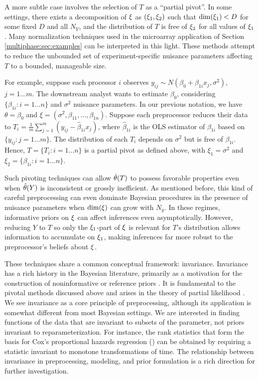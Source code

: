 A more subtle case involves the selection of $T$ as a ``partial pivot''.
In some settings, there exists a decomposition of $\xi$ as $(\xi_1, \xi_2)$ such that $\dim(\xi_1) < D$ for some fixed $D$ and all $N_Y$, and the distribution of $T$ is free of  $\xi_2$ for all values of $\xi_1$.
Many normalization techniques used in the microarray application of Section \ref{multiphase:sec:examples} can be interpreted in this light.
These methods attempt to reduce the unbounded set of experiment-specific nuisance parameters affecting $T$ to a bounded, manageable size.

For example, suppose each processor $i$ observes $y_{ij} \sim N(\beta_0 + \beta_{1i} x_j, \sigma^2)$, $j=1 \ldots m$.
The downstream analyst wants to estimate $\beta_0$, considering $\{\beta_{1i} : i=1 \ldots n\}$ and $\sigma^2$ nuisance parameters.
In our previous notation, we have $\theta = \beta_0$ and $\xi = \left( \sigma^2, \beta_{11}, \ldots, \beta_{1n} \right)$.
Suppose each preprocessor reduces their data to $T_i = \frac{1}{m} \sum_{j=1}^{m} (y_{ij} - \hat{\beta}_{1i} x_j)$, where $\hat{\beta}_{1i}$ is the OLS estimator of $\beta_{1i}$ based on $\{y_{ij} : j=1 \ldots m\}$.
The distribution of each $T_i$ depends on $\sigma^2$ but is free of $\beta_{1i}$.
Hence, $T = \{T_i : i=1 \ldots n\}$ is a partial pivot as defined above, with $\xi_1 = \sigma^2$ and $\xi_2 = \{\beta_{1i} : i=1 \ldots n\}$.

Such pivoting techniques can allow $\hat{\theta}(T)$ to possess favorable properties even when $\hat{\theta}(Y)$ is inconsistent or grossly inefficient.
As mentioned before, this kind of careful preprocessing can even dominate Bayesian procedures in the presence of nuisance parameters when $\dim(\xi)$ can grow with $N_y$.
In these regimes, informative priors on $\xi$ can affect inferences even asymptotically.
However, reducing $Y$ to $T$ so only the $\xi_{1}$-part of $\xi$ is relevant for $T$'s distribution allows information to accumulate on $\xi_1$, making inferences far more robust to the preprocessor's beliefs about $\xi$.


These techniques share a common conceptual framework: invariance.
Invariance has a rich history in the Bayesian literature, primarily as a motivation for the construction of noninformative or reference priors \citep[e.g.][]{Jeffreys1946,Hartigan1964,Geisser1979,Berger1992,Kass1996}.
It is fundamental to the pivotal methods discussed above and arises in the theory of partial likelihood \citep{Cox1975}.
We see invariance as a core principle of preprocessing, although its application is somewhat different from most Bayesian settings.
We are interested in finding functions of the data that are invariant to subsets of the parameter, not priors invariant to reparameterization. 
For instance, the rank statistics that form the basis for Cox's proportional hazards regression (\citeyear{Cox1972}) can be obtained by requiring a statistic invariant to monotone transformations of time.
The relationship between invariance in preprocessing, modeling, and prior formulation is a rich direction for further investigation.


